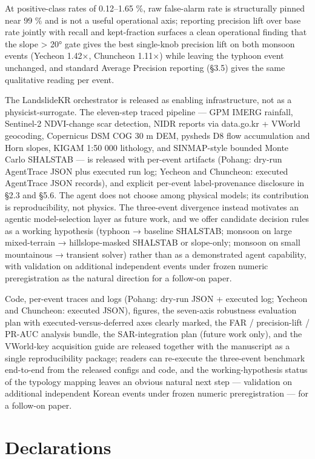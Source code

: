 \documentclass[11pt,a4paper]{article}
\begin{document}
At positive-class rates of 0.12--1.65 \%, raw false-alarm rate is structurally pinned near 99 \% and is not a useful operational axis; reporting precision lift over base rate jointly with recall and kept-fraction surfaces a clean operational finding that the slope \textgreater{} 20° gate gives the best single-knob precision lift on both monsoon events (Yecheon 1.42×, Chuncheon 1.11×) while leaving the typhoon event unchanged, and standard Average Precision reporting (§3.5) gives the same qualitative reading per event.

The LandslideKR orchestrator is released as enabling infrastructure, not as a physicist-surrogate. The eleven-step traced pipeline --- GPM IMERG rainfall, Sentinel-2 NDVI-change scar detection, NIDR reports via data.go.kr + VWorld geocoding, Copernicus DSM COG 30 m DEM, pysheds D8 flow accumulation and Horn slopes, KIGAM 1:50 000 lithology, and SINMAP-style bounded Monte Carlo SHALSTAB --- is released with per-event artifacts (Pohang: dry-run AgentTrace JSON plus executed run log; Yecheon and Chuncheon: executed AgentTrace JSON records), and explicit per-event label-provenance disclosure in §2.3 and §5.6. The agent does not choose among physical models; its contribution is reproducibility, not physics. The three-event divergence instead motivates an agentic model-selection layer as future work, and we offer candidate decision rules as a working hypothesis (typhoon → baseline SHALSTAB; monsoon on large mixed-terrain → hillslope-masked SHALSTAB or slope-only; monsoon on small mountainous → transient solver) rather than as a demonstrated agent capability, with validation on additional independent events under frozen numeric preregistration as the natural direction for a follow-on paper.

Code, per-event traces and logs (Pohang: dry-run JSON + executed log; Yecheon and Chuncheon: executed JSON), figures, the seven-axis robustness evaluation plan with executed-versus-deferred axes clearly marked, the FAR / precision-lift / PR-AUC analysis bundle, the SAR-integration plan (future work only), and the VWorld-key acquisition guide are released together with the manuscript as a single reproducibility package; readers can re-execute the three-event benchmark end-to-end from the released configs and code, and the working-hypothesis status of the typology mapping leaves an obvious natural next step --- validation on additional independent Korean events under frozen numeric preregistration --- for a follow-on paper.

\section{Declarations}\label{declarations}
\end{document}
